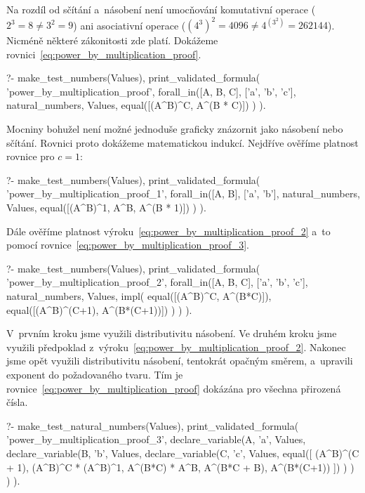 Na rozdíl od sčítání a~násobení není umocňování komutativní operace (\(2^3 = 8 \neq 3^2 = 9\)) ani asociativní operace (\((4^3)^2 = 4096 \neq 4^{(3^2)} = 262144\)). Nicméně některé zákonitosti zde platí. Dokážeme rovnici~\eqref{eq:power_by_multiplication_proof}.

\begin{fact}
\begin{prolog}
?-	make_test_numbers(Values),
	print_validated_formula(
		'power_by_multiplication_proof',
		forall_in([A, B, C], ['a', 'b', 'c'], natural_numbers, Values,
			equal([(A^B)^C, A^(B * C)])
		)
	).
\end{prolog}
\end{fact}

Mocniny bohužel není možné jednoduše graficky znázornit jako násobení nebo sčítání. Rovnici proto dokážeme matematickou indukcí. Nejdříve ověříme platnost rovnice pro \(c = 1\):

\begin{prolog}
?-	make_test_numbers(Values),
	print_validated_formula(
		'power_by_multiplication_proof_1',
		forall_in([A, B], ['a', 'b'], natural_numbers, Values,
			equal([(A^B)^1, A^B, A^(B * 1)])
		)
	).
\end{prolog}

Dále ověříme platnost výroku~\eqref{eq:power_by_multiplication_proof_2} a~to pomocí rovnice~\eqref{eq:power_by_multiplication_proof_3}.

\begin{prolog}
?-	make_test_numbers(Values),
	print_validated_formula(
		'power_by_multiplication_proof_2',
		forall_in([A, B, C], ['a', 'b', 'c'], natural_numbers, Values,
			impl(
				equal([(A^B)^C, 	A^(B*C)]),
				equal([(A^B)^(C+1), 	A^(B*(C+1))])
			)
		)
	).
\end{prolog}

V~prvním kroku jsme využili distributivitu násobení. Ve druhém kroku jsme využili předpoklad z~výroku~\eqref{eq:power_by_multiplication_proof_2}. Nakonec jsme opět využili distributivitu násobení, tentokrát opačným směrem, a~upravili exponent do požadovaného tvaru. Tím je rovnice~\eqref{eq:power_by_multiplication_proof} dokázána pro všechna přirozená čísla.

\begin{prolog}
?-	make_test_natural_numbers(Values),
	print_validated_formula(
		'power_by_multiplication_proof_3',
		declare_variable(A, 'a', Values,
			declare_variable(B, 'b', Values,
				declare_variable(C, 'c', Values,
					equal([
						(A^B)^(C + 1),
						(A^B)^C * (A^B)^1,
						A^(B*C) * A^B,
						A^(B*C + B),
						A^(B*(C+1))
					])
				)
			)
		)
	).
\end{prolog}

